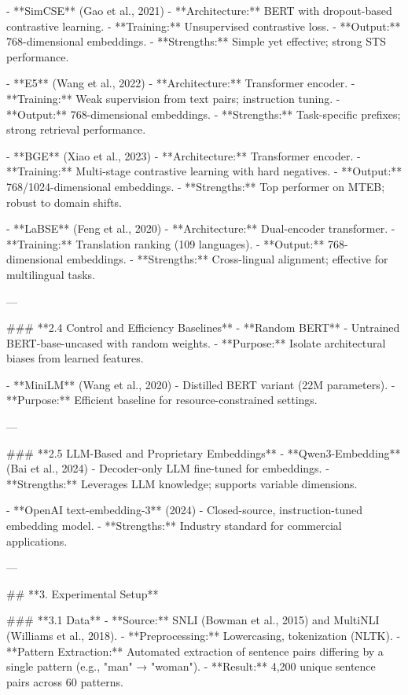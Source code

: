 - **SimCSE** (Gao et al., 2021)
  - **Architecture:** BERT with dropout-based contrastive learning.
  - **Training:** Unsupervised contrastive loss.
  - **Output:** 768-dimensional embeddings.
  - **Strengths:** Simple yet effective; strong STS performance.

- **E5** (Wang et al., 2022)
  - **Architecture:** Transformer encoder.
  - **Training:** Weak supervision from text pairs; instruction tuning.
  - **Output:** 768-dimensional embeddings.
  - **Strengths:** Task-specific prefixes; strong retrieval performance.

- **BGE** (Xiao et al., 2023)
  - **Architecture:** Transformer encoder.
  - **Training:** Multi-stage contrastive learning with hard negatives.
  - **Output:** 768/1024-dimensional embeddings.
  - **Strengths:** Top performer on MTEB; robust to domain shifts.

- **LaBSE** (Feng et al., 2020)
  - **Architecture:** Dual-encoder transformer.
  - **Training:** Translation ranking (109 languages).
  - **Output:** 768-dimensional embeddings.
  - **Strengths:** Cross-lingual alignment; effective for multilingual tasks.

---

### **2.4 Control and Efficiency Baselines**
- **Random BERT**
  - Untrained BERT-base-uncased with random weights.
  - **Purpose:** Isolate architectural biases from learned features.

- **MiniLM** (Wang et al., 2020)
  - Distilled BERT variant (22M parameters).
  - **Purpose:** Efficient baseline for resource-constrained settings.

---

### **2.5 LLM-Based and Proprietary Embeddings**
- **Qwen3-Embedding** (Bai et al., 2024)
  - Decoder-only LLM fine-tuned for embeddings.
  - **Strengths:** Leverages LLM knowledge; supports variable dimensions.

- **OpenAI text-embedding-3** (2024)
  - Closed-source, instruction-tuned embedding model.
  - **Strengths:** Industry standard for commercial applications.

---

## **3. Experimental Setup**

### **3.1 Data**
- **Source:** SNLI (Bowman et al., 2015) and MultiNLI (Williams et al., 2018).
- **Preprocessing:** Lowercasing, tokenization (NLTK).
- **Pattern Extraction:** Automated extraction of sentence pairs differing by a single pattern (e.g., "man" → "woman").
- **Result:** 4,200 unique sentence pairs across 60 patterns.

